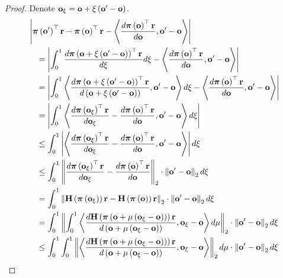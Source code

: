 \begin{proof}
Denote ${\mathbf{o}}_{\xi} = {\mathbf{o}} + \xi \left( {\mathbf{o}}^\prime - {\mathbf{o}} \right)$.
\begin{equation*}
\begin{split}
    &\left| \rvpi\left( \rvo^\prime \right)^\top \rvr - \rvpi\left( \rvo \right)^\top \rvr - \left\langle \frac{d \rvpi\left( \rvo \right)^\top \rvr}{d \rvo}, \rvo^\prime - \rvo \right\rangle \right| \\
    &\quad = \left| \int_0^1{ \frac{d \rvpi\left( \rvo + \xi \left( \rvo^\prime - \rvo \right) \right)^\top \rvr}{d \xi} d\xi} - \left\langle \frac{d \rvpi\left( \rvo \right)^\top \rvr}{d \rvo}, \rvo^\prime - \rvo \right\rangle \right| \\
    &\quad = \left| \int_0^1{ \left\langle \frac{d \rvpi\left( \rvo + \xi \left( \rvo^\prime - \rvo \right) \right)^\top \rvr}{d \left( \rvo + \xi \left( \rvo^\prime - \rvo \right) \right)}, \rvo^\prime - \rvo \right\rangle d\xi} - \left\langle \frac{d \rvpi\left( \rvo \right)^\top \rvr}{d \rvo}, \rvo^\prime - \rvo \right\rangle \right| \\
    &\quad = \left| \int_0^1{ \left\langle \frac{d \rvpi\left( \rvo_{\xi} \right)^\top \rvr}{d \rvo_{\xi}} - \frac{d \rvpi\left( \rvo \right)^\top \rvr}{d \rvo}, \rvo^\prime - \rvo \right\rangle d\xi} \right| \\
    &\quad \le \int_0^1{ \left| \left\langle \frac{d \rvpi\left( \rvo_{\xi} \right)^\top \rvr}{d \rvo_{\xi}} - \frac{d \rvpi\left( \rvo \right)^\top \rvr}{d \rvo}, \rvo^\prime - \rvo \right\rangle \right| d\xi} \\
    &\quad \le \int_0^1{ \left\| \frac{d \rvpi\left( \rvo_{\xi} \right)^\top \rvr}{d \rvo_{\xi}} - \frac{d \rvpi\left( \rvo \right)^\top \rvr}{d \rvo} \right\|_2 \cdot \left\| \rvo^\prime - \rvo \right\|_2 d\xi} \\
    &\quad = \int_0^1{ \left\| \rmH\left( \rvpi\left( \rvo_{\xi} \right)\right) \rvr - \rmH\left( \rvpi\left( \rvo \right)\right) \rvr \right\|_2 \cdot \left\| \rvo^\prime - \rvo \right\|_2 d\xi} \\
    &\quad = \int_0^1{ \left\| \int_0^1{\left\langle \frac{d \rmH \left( \rvpi\left( \rvo + \mu\left( \rvo_{\xi} - \rvo \right) \right) \right) \rvr }{d \left( \rvo + \mu\left( \rvo_{\xi} - \rvo \right) \right)}, \rvo_{\xi} - \rvo \right\rangle d\mu} \right\|_2 \cdot \left\| \rvo^\prime - \rvo \right\|_2 d\xi} \\
    &\quad \le \int_0^1{  \int_0^1{ \left\| \left\langle \frac{d \rmH \left( \rvpi\left( \rvo + \mu\left( \rvo_{\xi} - \rvo \right) \right) \right) \rvr }{d \left( \rvo + \mu\left( \rvo_{\xi} - \rvo \right) \right)}, \rvo_{\xi} - \rvo \right\rangle \right\|_2 d\mu} \cdot \left\| \rvo^\prime - \rvo \right\|_2 d\xi} \\

\end{split}
\end{equation*}
\end{proof}
